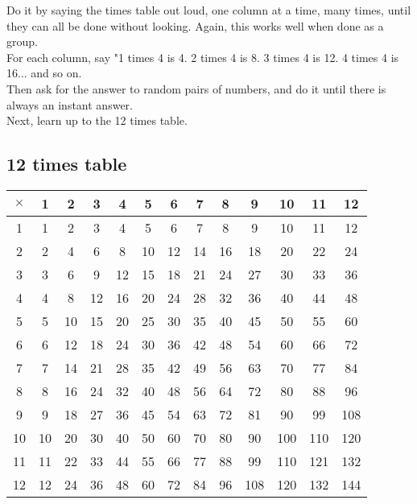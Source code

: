 \documentclass{article}
\begin{document}
\begin{spacing}{1.25}
\vspace{32pt}
Do it by saying the times table out loud, one column at a time, many times, until they can all be done without looking. Again, this works well when done as a group.\\

For each column, say "1 times 4 is 4. 2 times 4 is 8. 3 times 4 is 12. 4 times 4 is 16... and so on.\\

Then ask for the answer to random pairs of numbers, and do it until there is always an instant answer.\\

Next, learn up to the 12 times table.

\newpage

\subsection*{12 times table}

\begin{center}
\begin{tabular}{|c||c|c|c|c|c|c|c|c|c|c|c|c|}
\hline
$\times$ & 1 & 2 & 3 & 4 & 5 & 6 & 7 & 8 & 9 & 10 & 11 & 12 \\
\hline\hline
1 & 1 & 2 & 3 & 4 & 5 & 6 & 7 & 8 & 9 & 10 & 11 & 12 \\
2 & 2 & 4 & 6 & 8 & 10 & 12 & 14 & 16 & 18 & 20 & 22 & 24 \\
3 & 3 & 6 & 9 & 12 & 15 & 18 & 21 & 24 & 27 & 30 & 33 & 36 \\
4 & 4 & 8 & 12 & 16 & 20 & 24 & 28 & 32 & 36 & 40 & 44 & 48 \\
5 & 5 & 10 & 15 & 20 & 25 & 30 & 35 & 40 & 45 & 50 & 55 & 60 \\
6 & 6 & 12 & 18 & 24 & 30 & 36 & 42 & 48 & 54 & 60 & 66 & 72 \\
7 & 7 & 14 & 21 & 28 & 35 & 42 & 49 & 56 & 63 & 70 & 77 & 84 \\
8 & 8 & 16 & 24 & 32 & 40 & 48 & 56 & 64 & 72 & 80 & 88 & 96 \\
9 & 9 & 18 & 27 & 36 & 45 & 54 & 63 & 72 & 81 & 90 & 99 & 108 \\
10 & 10 & 20 & 30 & 40 & 50 & 60 & 70 & 80 & 90 & 100 & 110 & 120 \\
11 & 11 & 22 & 33 & 44 & 55 & 66 & 77 & 88 & 99 & 110 & 121 & 132 \\
12 & 12 & 24 & 36 & 48 & 60 & 72 & 84 & 96 & 108 & 120 & 132 & 144 \\
\hline
\end{tabular}
\end{center}


\end{spacing}
\end{document}

